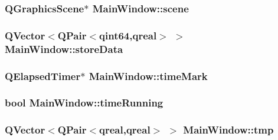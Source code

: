 \hypertarget{class_main_window_a51ac2b126495216832501cea3929c6f6}{
\subsubsection[{scene}]{\setlength{\rightskip}{0pt plus 5cm}Q\-Graphics\-Scene$\ast$ Main\-Window\-::scene\hspace{0.3cm}{\ttfamily [private]}}}\label{class_main_window_a51ac2b126495216832501cea3929c6f6}
\hypertarget{class_main_window_a2759b4057b444152680d6c8ec05a6cac}{
\subsubsection[{store\-Data}]{\setlength{\rightskip}{0pt plus 5cm}Q\-Vector$<$Q\-Pair$<$qint64,qreal$>$ $>$ Main\-Window\-::store\-Data\hspace{0.3cm}{\ttfamily [private]}}}\label{class_main_window_a2759b4057b444152680d6c8ec05a6cac}
\hypertarget{class_main_window_a8ce9e134300261f607e1f488a9ef8a1d}{
\subsubsection[{time\-Mark}]{\setlength{\rightskip}{0pt plus 5cm}Q\-Elapsed\-Timer$\ast$ Main\-Window\-::time\-Mark\hspace{0.3cm}{\ttfamily [private]}}}\label{class_main_window_a8ce9e134300261f607e1f488a9ef8a1d}
\hypertarget{class_main_window_ac5db45f96085abb0a0ac25e981e8d1df}{
\subsubsection[{time\-Running}]{\setlength{\rightskip}{0pt plus 5cm}bool Main\-Window\-::time\-Running\hspace{0.3cm}{\ttfamily [private]}}}\label{class_main_window_ac5db45f96085abb0a0ac25e981e8d1df}
\hypertarget{class_main_window_a4daf46ba6fc596693c66c97db90cc700}{
\subsubsection[{tmp}]{\setlength{\rightskip}{0pt plus 5cm}Q\-Vector$<$Q\-Pair$<$qreal,qreal$>$ $>$ Main\-Window\-::tmp\hspace{0.3cm}{\ttfamily [private]}}}\label{class_main_window_a4daf46ba6fc596693c66c97db90cc700}
